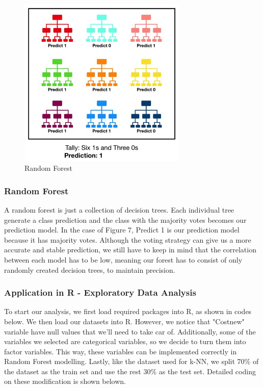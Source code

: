 \documentclass[12pt]{article} %
\theoremstyle{definition}
\begin{document}
\begin{figure}[H]
    \centering
    \includegraphics[width=8cm]{p2.png}
    \caption{Random Forest}
    \label{fig:my_label}
\end{figure}

\subsubsection{Random Forest}
A random forest is just a collection of decision trees. Each individual tree generate a class prediction and the class with the majority votes becomes our prediction model. In the case of Figure 7, Predict 1 is our prediction model because it has majority votes. Although the voting strategy can give us a more accurate and stable prediction, we still have to keep in mind that the correlation between each model has to be low, meaning our forest has to consist of only randomly created decision trees, to maintain precision.

\subsubsection{Application in R - Exploratory Data Analysis}
To start our analysis, we first load required packages into R, as shown in codes below. We then load our datasets into R. However, we notice that "Costnew" variable have null values that we'll need to take car of. Additionally, some of the variables we selected are categorical variables, so we decide to turn them into factor variables. This way, these variables can be implemented correctly in Random Forest modelling. Lastly, like the dataset used for k-NN, we split 70\% of the dataset as the train set and use the rest 30\% as the test set. Detailed coding on these modification is shown belown.
\end{document}
